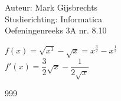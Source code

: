\documentclass[a4paper]{article}
\begin{document}
\noindent \large Auteur: Mark Gijsbrechts \\
\noindent \large Studierichting: Informatica\\
\noindent \large Oefeningenreeks 3A nr. 8.10\\

\medskip

\normalsize





$f(x) = \sqrt{x^3} - \sqrt{x} = x^{\frac{3}{2}} - x^{\frac{1}{2}} $ \\

$f'(x) = \dfrac{3}{2}\sqrt{x} - \dfrac{1}{2 \sqrt{x}} $


\begin{thebibliography}{999}
\end{thebibliography}
\end{document}
